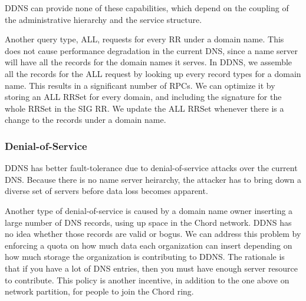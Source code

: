 DDNS can provide none of these capabilities, which depend
on the coupling of the administrative hierarchy and the service structure.

Another query type, ALL, requests for every RR 
under a domain name. This does not cause performance 
degradation in the current DNS, since a name server
will have all the records for the domain names it serves.
In DDNS, we assemble all the records for the ALL 
request by looking up every record types for a domain 
name. This results in a significant number of RPCs. 
We can optimize it by storing an ALL RRSet for every 
domain, and including the signature for the whole RRSet in
the SIG RR. We update the ALL RRSet whenever there is 
a change to the records under a domain name.

\subsubsection{Denial-of-Service}

DDNS has better fault-tolerance due to denial-of-service attacks 
over the current DNS. 
Because there is no name server heirarchy, the 
attacker has to bring down a diverse
set of servers before data loss becomes apparent.

Another type of denial-of-service is caused by 
a domain name owner inserting a large number 
of DNS records, using up space in the Chord network.
DDNS has no idea whether those records
are valid or bogus. We can address this problem 
by enforcing a quota on how much data each organization
can insert depending on how much storage the organization
is contributing to DDNS. The rationale is that if you
have a lot of DNS entries, then you must have 
enough server resource to contribute.
This policy is another incentive,
in addition to the one above on network partition,
for people to join the Chord ring.



